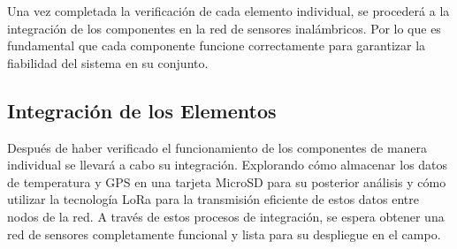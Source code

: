 Una vez completada la verificación de cada elemento individual, se procederá a la integración de los componentes en la red de sensores inalámbricos. Por lo que es fundamental que cada componente funcione correctamente para garantizar la fiabilidad del sistema en su conjunto.

\subsection{Integración de los Elementos}
Después de haber verificado el funcionamiento de los componentes de manera individual se llevará a cabo su integración. Explorando cómo almacenar los datos de temperatura y GPS en una tarjeta MicroSD para su posterior análisis y cómo utilizar la tecnología LoRa para la transmisión eficiente de estos datos entre nodos de la red. A través de estos procesos de integración, se espera obtener una red de sensores completamente funcional y lista para su despliegue en el campo.
